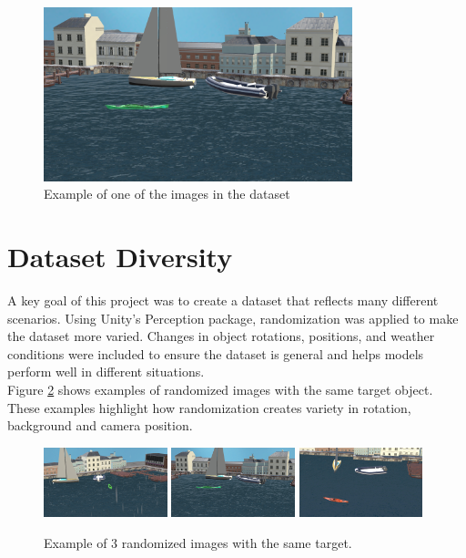 \begin{figure}[H]
\centering
\includegraphics[width=0.8\textwidth]{Figures/results/rand2.png}
\caption{Example of one of the images in the dataset}
\label{fig:original_image}
\end{figure}

\section{Dataset Diversity}
A key goal of this project was to create a dataset that reflects many different scenarios. Using Unity's Perception package, randomization was applied to make the dataset more varied. Changes in object rotations, positions, and weather conditions were included to ensure the dataset is general and helps models perform well in different situations.\\

\noindent Figure \ref{fig:randomized_images} shows examples of randomized images with the same target object. These examples highlight how randomization creates variety in rotation, background and camera position.

\begin{figure}[H]
\centering
\includegraphics[width=0.32\textwidth]{Figures/results/rand1.png}
\includegraphics[width=0.32\textwidth]{Figures/results/rand2.png}
\includegraphics[width=0.32\textwidth]{Figures/results/rand3.png}
\caption{Example of 3 randomized images with the same target.}
\label{fig:randomized_images}
\end{figure}

